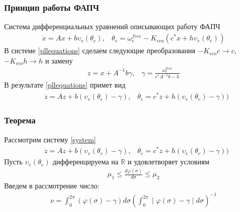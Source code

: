 \documentclass{beamer}
\begin{document}
\begin{frame}
\frametitle{Принцип работы ФАПЧ}
Система дифференциальных уравнений описывающих работу ФАПЧ
 \begin{equation}\label{pllequations}
 \begin{aligned}
 \dot{x} = Ax + b\upsilon_e(\theta_e)  \text{,} \quad \dot{\theta}_e = \omega_e^{free} - K_{vco}(c^*x + h\upsilon_e(\theta_e))
 \end{aligned}
\end{equation}
В системе \eqref{pllequations} сделаем следующие преобразования $-K_{vco}c \rightarrow c$, $-K_{vco}h \rightarrow h$ и замену
 \begin{equation}
 \begin{aligned}
 z = x + A^{-1}b\gamma  \text{,} \quad \gamma = \frac{\omega_e^{free}}{c^*A^{-1}b-h}
 \end{aligned}
\end{equation}
В результате \eqref{pllequations} примет вид
 \begin{equation}\label{system}
 \begin{aligned}
 &\dot{z} = Az + b(\upsilon_e(\theta_e) - \gamma) \text{,} \quad \dot{\theta_e} = c^*z + h(\upsilon_e(\theta_e) - \gamma))
 \end{aligned}
\end{equation}
\end{frame}

\begin{frame}
\frametitle{Теорема}
Рассмотрим систему \eqref{system}
 \begin{equation}
 \begin{aligned}
 &\dot{z} = Az + b(\upsilon_e(\theta_e) - \gamma) \text{,} \quad \dot{\theta_e} = c^*z + h(\upsilon_e(\theta_e) - \gamma))
 \end{aligned}
\end{equation}
Пусть $\upsilon_e(\theta_e)$ дифференцируема на $\mathbb {R}$ и удовлетворяет условиям
 \begin{equation}\label{theoreme_inequation}
 \begin{aligned}
\mu_1 \leq \frac{d\varphi(\sigma)}{d\sigma} \leq \mu_2
 \end{aligned}
\end{equation}
Введем в рассмотрение число:
 \begin{equation}
 \begin{aligned}
\nu = \int_{0}^{2\pi} (\varphi(\sigma) - \gamma) d\sigma (\int_{0}^{2\pi} \mid \varphi(\sigma) - \gamma \mid d\sigma)^{-1}
 \end{aligned}
\end{equation}
\end{frame}
\end{document}
